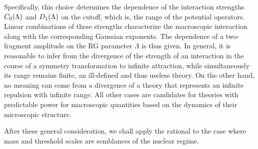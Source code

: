 \documentclass[onecolumn,preprint,superscriptaddress,nofootinbib,notitlepage,10pt,linenumbers]{revtex4-1}
\newcommand{\cc}{\ensuremath C_0(\Lambda)}
\newcommand{\dd}{\ensuremath D_1(\Lambda)}
\begin{document}
Specifically, this choice determines the dependence of the interaction
strengths $\cc$ and $\dd$ on the cutoff, which is, the range of the
potential operators. Linear combinations of these strengths characterize
the macroscopic interaction along with the corresponding Gaussian
exponents. The dependence of a two-fragment amplitude on the RG parameter
$\Lambda$ is thus given. In general, it is reasonable to infer from the
divergence of the strength of an interaction in the course of a symmetry 
transformation to infinite attraction,
while simultaneously its range remains finite, an
ill-defined and thus useless theory.
On the other hand, no meaning can come from a divergence of a theory
that represents an infinite repulsion with infinite range.
All other cases are candidates for theories with predictable power
for macroscopic quantities based on the dynamics of their microscopic
structure.

After these general consideration, we shall apply the rational to the
case where mass and threshold scales are semblances of the nuclear regime.
\end{document}
